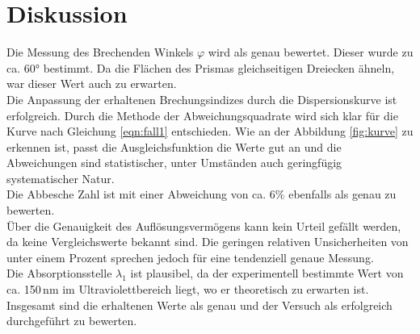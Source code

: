 \section{Diskussion}
\label{sec:Diskussion}
Die Messung des Brechenden Winkels $\varphi$ wird als genau bewertet. Dieser wurde
zu ca. 60° bestimmt. Da die Flächen des Prismas gleichseitigen Dreiecken
ähneln, war dieser Wert auch zu erwarten.\\
Die Anpassung der erhaltenen Brechungsindizes durch die Dispersionskurve ist erfolgreich.
Durch die Methode der Abweichungsquadrate wird sich klar für die Kurve nach
Gleichung \eqref{eqn:fall1} entschieden. Wie an der Abbildung \ref{fig:kurve} zu
erkennen ist, passt die Ausgleichsfunktion die Werte gut an und die Abweichungen
sind statistischer, unter Umständen auch geringfügig systematischer Natur.\\
Die Abbesche Zahl ist mit einer Abweichung von ca. 6\% ebenfalls als genau zu bewerten.\\
Über die Genauigkeit des Auflösungsvermögens kann kein Urteil gefällt werden, da keine
Vergleichswerte bekannt sind. Die geringen relativen Unsicherheiten von unter einem Prozent
sprechen jedoch für eine tendenziell genaue Messung.\\
Die Absorptionsstelle $\lambda_1$ ist plausibel, da der experimentell bestimmte Wert von ca. 150\,nm im
Ultraviolettbereich liegt, wo er theoretisch zu erwarten ist.\\
Insgesamt sind die erhaltenen Werte als genau und der Versuch als erfolgreich
durchgeführt zu bewerten.

